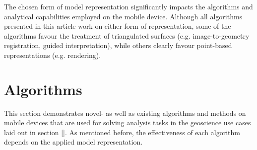 \documentclass[review]{elsarticle}
\begin{document}
The chosen form of model representation significantly impacts the algorithms and analytical capabilities employed on the mobile device. Although all algorithms presented in this article work on either form of representation, some of the algorithms favour the treatment of triangulated surfaces (e.g. image-to-geometry registration, guided interpretation), while others clearly favour point-based representations (e.g. rendering).

\section{Algorithms}
\label{sec:algorithms}

This section demonstrates novel- as well as existing algorithms and methods on mobile devices that are used for solving analysis tasks in the geoscience use cases laid out in section \ref{}. As mentioned before, the effectiveness of each algorithm depends on the applied model representation.

%

\end{document}
